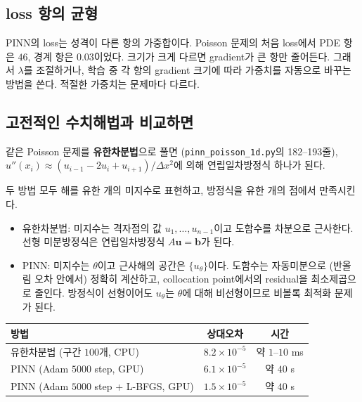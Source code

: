 \documentclass[11pt,a4paper]{article}
\newcommand{\vect}[1]{\bm{#1}}
\begin{document}
\subsection{loss 항의 균형}

PINN의 loss는 성격이 다른 항의 가중합이다. Poisson 문제의 처음 loss에서 PDE 항은 $46$, 경계 항은 $0.03$이었다.
크기가 크게 다르면 gradient가 큰 항만 줄어든다. 그래서 $\lambda$를 조절하거나, 학습 중 각 항의 gradient 크기에 따라 가중치를 자동으로 바꾸는 방법을 쓴다.
적절한 가중치는 문제마다 다르다.

\subsection{고전적인 수치해법과 비교하면}

같은 Poisson 문제를 \textbf{유한차분법}으로 풀면 (\texttt{pinn\_poisson\_1d.py}의 182--193줄),
$u''(x_i)\approx(u_{i-1}-2u_i+u_{i+1})/\Delta x^2$에 의해 연립일차방정식 하나가 된다.

\begin{remarkbox}
두 방법 모두 해를 유한 개의 미지수로 표현하고, 방정식을 유한 개의 점에서 만족시킨다.
\begin{itemize}[leftmargin=1.5em]
\item 유한차분법: 미지수는 격자점의 값 $u_1,\dots,u_{n-1}$이고 도함수를 차분으로 근사한다. 선형 미분방정식은 연립일차방정식 $A\vect u=\vect b$가 된다.
\item PINN: 미지수는 $\theta$이고 근사해의 공간은 $\{u_\theta\}$이다. 도함수는 자동미분으로 (반올림 오차 안에서) 정확히 계산하고,
collocation point에서의 residual을 최소제곱으로 줄인다. 방정식이 선형이어도 $u_\theta$는 $\theta$에 대해 비선형이므로 비볼록 최적화 문제가 된다.
\end{itemize}
\end{remarkbox}

\begin{center}
\begin{tabular}{@{}lcc@{}}
\toprule
방법 & 상대오차 & 시간 \\
\midrule
유한차분법 (구간 $100$개, CPU) & $8.2\times10^{-5}$ & 약 $1$--$10$ ms \\
PINN (Adam $5000$ step, GPU) & $6.1\times10^{-5}$ & 약 $40$ s \\
PINN (Adam $5000$ step + L-BFGS, GPU) & $1.5\times10^{-5}$ & 약 $40$ s \\
\bottomrule
\end{tabular}
\end{center}
\end{document}
